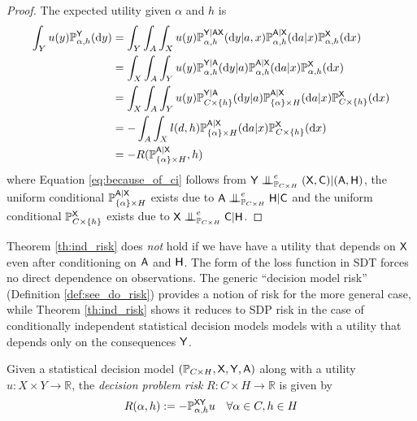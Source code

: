 \begin{proof}
The expected utility given $\alpha$ and $h$ is
\begin{align}
    \int_Y u(y)\mathbb{P}_{\alpha,h}^{\mathsf{Y}}(\mathrm{d}y) &= \int_Y  \int_A \int_{X} u(y)\mathbb{P}_{\alpha,h}^{\mathsf{Y}|\mathsf{AX}}(\mathrm{d}y|a,x)\mathbb{P}_{\alpha,h}^{\mathsf{A}|\mathsf{X}}(\mathrm{d}a|x)\mathbb{P}_{\alpha,h}^{\mathsf{X}}(\mathrm{d}x) \\
    &= \int_X  \int_A \int_{Y} u(y) \mathbb{P}_{\alpha,h}^{\mathsf{Y}|\mathsf{A}}(\mathrm{d}y|a)\mathbb{P}_{\alpha,h}^{\mathsf{A}|\mathsf{X}}(\mathrm{d}a|x)\mathbb{P}_{\alpha,h}^{\mathsf{X}}(\mathrm{d}x)\label{eq:because_of_ci}\\
    &= \int_{X} \int_A \int_Y u(y) \mathbb{P}_{C\times\{h\}}^{\mathsf{Y}|\mathsf{A}}(\mathrm{d}y|a)\mathbb{P}_{\{\alpha\}\times H}^{\mathsf{A}|\mathsf{X}}(\mathrm{d}a|x)\mathbb{P}_{C\times\{h\}}^{\mathsf{X}}(\mathrm{d}x)\\
     &= -\int_A\int_X l(d,h)\mathbb{P}_{\{\alpha\}\times H}^{\mathsf{A}|\mathsf{X}}(\mathrm{d}a|x)\mathbb{P}_{C\times\{h\}}^{\mathsf{X}}(\mathrm{d}x)\\
    &= -R(\mathbb{P}_{\{\alpha\}\times H}^{\mathsf{A}|\mathsf{X}},h)
\end{align}
where Equation \eqref{eq:because_of_ci} follows from $\RV{Y}\CI^e_{\prob{P}_{C\times H}} (\RV{X,C})|(\RV{A},\RV{H})$, the uniform conditional $\mathbb{P}_{\{\alpha\}\times H}^{\mathsf{A}|\mathsf{X}}$ exists due to $\RV{A}\CI^e_{\prob{P}_{C\times H}} \RV{H}|\RV{C}$ and the uniform conditional $\mathbb{P}_{C\times\{h\}}^{\mathsf{X}}$ exists due to $\RV{X}\CI^e_{\prob{P}_{C\times H}} \RV{C}|\RV{H}$.
\end{proof}

Theorem \ref{th:ind_risk} does \emph{not} hold if we have have a utility that depends on $\mathsf{X}$ even after conditioning on $\mathsf{A}$ and $\mathsf{H}$. The form of the loss function in SDT forces no direct dependence on observations. The generic ``decision model risk'' (Definition \ref{def:see_do_risk}) provides a notion of risk for the more general case, while Theorem \ref{th:ind_risk} shows it reduces to SDP risk in the case of conditionally independent statistical decision models models with a utility that depends only on the consequences $\mathsf{Y}$.
\begin{definition}\label{def:see_do_risk}
Given a statistical decision model $(\mathbb{P}_{C\times H}, \mathsf{X},\mathsf{Y},\mathsf{A})$ along with a utility $u:X\times Y\to \mathbb{R}$, the \emph{decision problem risk} $R:C\times H\to \mathbb{R}$ is given by
\begin{align}
    R(\alpha,h) &:= -\mathbb{P}_{\alpha,h}^{\mathsf{XY}}u&\forall \alpha\in C,h\in H
\end{align}
\end{definition}

